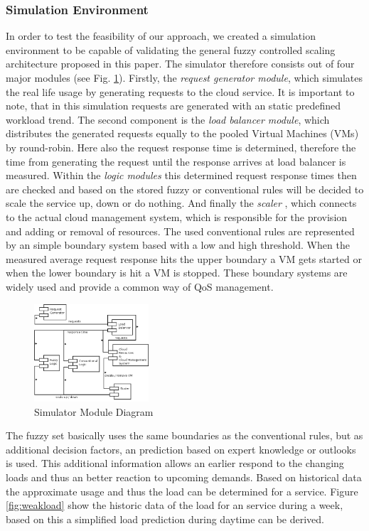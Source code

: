 \subsubsection{Simulation Environment}\label{SimEnv}
In order to test the feasibility of our approach, we created a simulation environment to be capable of validating the general fuzzy controlled scaling architecture proposed in this paper. The simulator therefore consists out of four major modules (see Fig. \ref{fig:module_diagram}). Firstly, the \textit{request generator module}, which simulates the real life usage by generating requests to the cloud service. It is important to note, that in this simulation requests are generated with an static predefined workload trend. The second component is the \textit{load balancer module}, which distributes the generated requests equally to the pooled Virtual Machines (VMs) by round-robin. Here also the request response time is determined, therefore the time from generating the request until the response arrives at load balancer is measured. Within the \textit{logic modules} this determined request response times then are checked and based on the stored fuzzy or conventional rules will be decided to scale the service up, down or do nothing.  And finally the \textit{scaler }, which connects to the actual cloud management system, which is responsible for the provision and adding or removal of resources. The used conventional rules are represented by an simple boundary system based with a low and high threshold. When the measured average request response hits the upper boundary a VM gets started or when the lower boundary is hit a VM is stopped. These boundary systems are widely used and provide a common way of QoS management.
\begin{figure}[ht]
\begin{center}
\includegraphics[width=0.38\textwidth]{fig/ModuleDiagram2.png}
\end{center}
\caption{Simulator Module Diagram}
\label{fig:module_diagram}
\end{figure}
The fuzzy set basically uses the same boundaries as the conventional rules, but as additional decision factors, an prediction based on expert knowledge or outlooks is used. This additional information allows an earlier respond to the changing loads and thus an better reaction to upcoming demands. Based on historical data the approximate usage and thus the load can be determined for a service. Figure \ref{fig:weakload} show the historic data of the load for an service during a week, based on this a simplified load prediction during daytime can be derived. %
